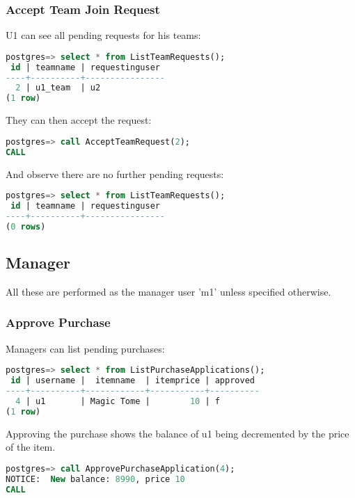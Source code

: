 \subsubsection{Accept Team Join Request}

U1 can see all pending requests for his teams:

\begin{lstlisting}[language=SQL]
postgres=> select * from ListTeamRequests();
 id | teamname | requestinguser 
----+----------+----------------
  2 | u1_team  | u2
(1 row)
\end{lstlisting}


They can then accept the request:

\begin{lstlisting}[language=SQL]
postgres=> call AcceptTeamRequest(2);
CALL
\end{lstlisting}

And observe there are no further pending requests:

\begin{lstlisting}[language=SQL]
postgres=> select * from ListTeamRequests();
 id | teamname | requestinguser 
----+----------+----------------
(0 rows)
\end{lstlisting}

\subsection{Manager}

All these are performed as the manager user 'm1' unless specified otherwise.

\subsubsection{Approve Purchase}

Managers can list pending purchases:

\begin{lstlisting}[language=SQL]
postgres=> select * from ListPurchaseApplications();
 id | username |  itemname  | itemprice | approved 
----+----------+------------+-----------+----------
  4 | u1       | Magic Tome |        10 | f
(1 row)
\end{lstlisting}

Approving the purchase shows the balance of u1 being decremented by the price of the item.

\begin{lstlisting}[language=SQL]
postgres=> call ApprovePurchaseApplication(4);
NOTICE:  New balance: 8990, price 10
CALL
\end{lstlisting}

